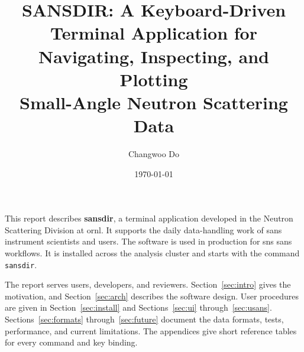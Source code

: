 \documentclass[tm]{ornltm}
\author{Changwoo Do}
\title{SANSDIR: A Keyboard-Driven Terminal Application for\\
Navigating, Inspecting, and Plotting\\
Small-Angle Neutron Scattering Data}
\date{\today}
\begin{document}
\frontmatter

\tableofcontents
\listoffigures
\listoftables
\printacronyms

\begin{foreword}

This report describes \textbf{sansdir}, a terminal application developed in the
Neutron Scattering Division at \ac{ornl}. It supports the daily data-handling
work of \ac{sans} instrument scientists and users. The software is used in
production for \ac{sns} \ac{sans} workflows. It is installed across the analysis
cluster and starts with the command \texttt{sansdir}.

The report serves users, developers, and reviewers. Section~\ref{sec:intro}
gives the motivation, and Section~\ref{sec:arch} describes the software design.
User procedures are given in Section~\ref{sec:install} and
Sections~\ref{sec:ui} through~\ref{sec:usans}. Sections~\ref{sec:formats}
through~\ref{sec:future} document the data formats, tests, performance, and
current limitations. The appendices give short reference tables for every
command and key binding.

\end{foreword}
\end{document}
